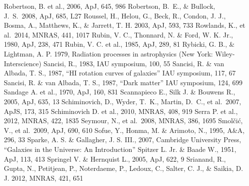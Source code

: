 \begin{thebibliography}{99}
\begin{multicols}{2}
{    	Robertson, B. et al., 2006, ApJ, 645, 986
	Robertson, B.~E., \& Bullock, J.~S.\ 2008, ApJ, 685, L27 
    	Roussel, H., Helou, G., Beck, R., Condon, J. J., Bosma, A.,
    	Matthews, K., \& Jarrett, T. H. 2003, ApJ, 593, 733
    	Rowlands, K., et al.\ 2014, MNRAS, 441, 1017
	Rubin, V. C., Thonnard, N. \& Ford, W. K. Jr., 1980, ApJ, 238, 471
	Rubin, V. C. et al., 1985, ApJ, 289, 81
	Rybicki, G. B., \& Lightman, A. P. 1979, Radiation processes in astrophysics (New York: Wiley-Interscience)
	Sancisi, R., 1983, IAU symposium, 100, 55
	Sancisi, R. \& van Albada, T. S., 1987, ``HI rotation curves of galaxies'' IAU symposium, 117, 67
	Sancisi, R. \& van Albada, T. S., 1987, ``Dark matter'' IAU symposium, 124, 699
	Sandage A. et al., 1970, ApJ, 160, 831
	Scannapieco E., Silk J. \& Bouwens R., 2005, ApJ, 635, 13
	Schiminovich, D., Wyder, T.~K., Martin, D.~C., et al.\ 2007, ApJS, 173, 315 
	Schiminovich D. et al., 2010, MNRAS, 408, 919
	Serra P. et al., 2012, MNRAS, 422, 1835
    	Seymour, N., et al.\ 2008, MNRAS, 386, 1695
    	Smol\v{c}i\'{c}, V., et al.\ 2009, ApJ, 690, 610
	Sofue, Y., Honma, M. \& Arimoto, N., 1995, A\&A, 296, 33
	Sparke, A. S. \& Gallagher, J. S. III., 2007, Cambridge University Press, 
	``Galaxies in the Universe: An Introduction''
	Spitzer L. Jr. \& Baade W., 1951, ApJ, 113, 413
	Springel V. \& Hernquist L., 2005, ApJ, 622, 9
    	Srianand, R., Gupta, N., Petitjean, P., Noterdaeme, P., Ledoux, C., Salter, C. J.,
    	\& Saikia, D. J. 2012, MNRAS, 421, 651
}
\end{multicols}
\end{thebibliography}

